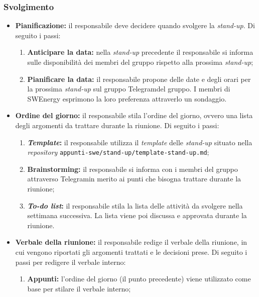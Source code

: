 \subsubsection*{Svolgimento}
\begin{itemize}

	\item \textbf{Pianificazione:} il responsabile deve decidere quando
		svolgere la \textit{stand-up}. Di seguito i passi:
		\begin{enumerate}
			\item \textbf{Anticipare la data:} nella \textit{stand-up}
					precedente il responsabile si informa sulle disponibilità
					dei membri del gruppo rispetto alla prossima
					\textit{stand-up};

			\item \textbf{Pianificare la data:} il responsabile propone delle
					date e degli orari per la prossima \textit{stand-up} sul
					gruppo Telegram\g del gruppo. I membri di SWEnergy esprimono
					la loro preferenza attraverlo un sondaggio.
		\end{enumerate}

	\item \textbf{Ordine del giorno:} il responsabile stila l'ordine del
		giorno, ovvero una lista degli argomenti da trattare durante la
		riunione. Di seguito i passi:
		\begin{enumerate}
			\item \textbf{\textit{Template}:} il responsabile utilizza il \textit{template}
					delle \textit{stand-up} situato nella \textit{repository\g}
					\texttt{appunti-swe/stand-up/template-stand-up.md};

			\item \textbf{Brainstorming:} il responsabile si informa con i
					membri del gruppo attraverso Telegram\g in merito ai
					punti che bisogna trattare durante la riunione;

			\item \textbf{\textit{To-do list}:} il responsabile stila la lista
					delle attività da svolgere nella settimana successiva. La
					lista viene poi discussa e approvata durante la riunione.
		\end{enumerate}

	\item \textbf{Verbale della riunione:} il responsabile redige il
		verbale della riunione, in cui vengono riportati gli argomenti
		trattati e le decisioni prese. Di seguito i passi per redigere il
		verbale interno:
		\begin{enumerate}
			\item \textbf{Appunti:} l'ordine del giorno (il punto precedente)
					viene utilizzato come base per stilare il verbale interno;


\end{enumerate}
\end{itemize}

